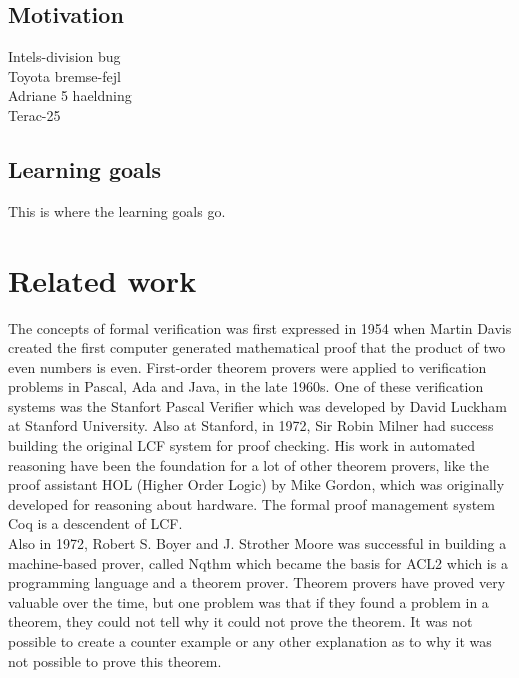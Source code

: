 \documentclass[a4paper]{report}
\begin{document}
\section{Motivation}
Intels-division bug \\
Toyota bremse-fejl\\
Adriane 5 haeldning\\
Terac-25\\
\section{Learning goals}
This is where the learning goals go.
\chapter{Related work}
The concepts of formal verification was first expressed in 1954 when Martin Davis created the first computer generated mathematical proof that the product of two even numbers is even. First-order theorem provers were applied to verification problems in Pascal, Ada and Java, in the late 1960s. One of these verification systems was the Stanfort Pascal Verifier\cite{Verifier1979} which was developed by David Luckham at Stanford University.
Also at Stanford, in 1972, Sir Robin Milner had success building the original LCF system for proof checking. His work in automated reasoning have been the foundation for a lot of other theorem provers, like the proof assistant HOL (Higher Order Logic) by Mike Gordon, which was originally developed for reasoning about hardware. The formal proof management system Coq is a descendent of LCF. \\
Also in 1972, Robert S. Boyer and J. Strother Moore was successful in building a machine-based prover, called Nqthm which became the basis for ACL2 which is a programming language and a theorem prover. Theorem provers have proved very valuable over the time, but one problem was that if they found a problem in a theorem, they could not tell why it could not prove the theorem. It was not possible to create a counter example or any other explanation as to why it was not possible to prove this theorem. \\\\
\end{document}
